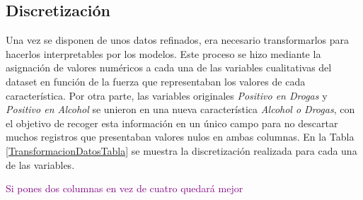 \documentclass{uathesis-es}
\begin{document}
{\subsection*{Discretización}

Una vez se disponen de unos datos refinados, era necesario transformarlos para hacerlos interpretables por los modelos. Este proceso se hizo mediante la asignación de valores numéricos a cada una de las variables cualitativas del dataset en función de la fuerza que representaban los valores de cada característica. Por otra parte, las variables originales \textit{Positivo en Drogas} y \textit{Positivo en Alcohol} se unieron en una nueva característica \textit{Alcohol o Drogas}, con el objetivo de recoger esta información en un único campo para no descartar muchos registros que presentaban valores nulos en ambas columnas. En la Tabla \ref{TransformacionDatosTabla} se muestra la discretización realizada para cada una de las variables.

\textcolor{purple}{Si pones dos columnas en vez de cuatro quedará mejor}
\begin{table}[ht]
    \centering
    \renewcommand{\arraystretch}{1.2}
    \small


\end{table}}
\end{document}
